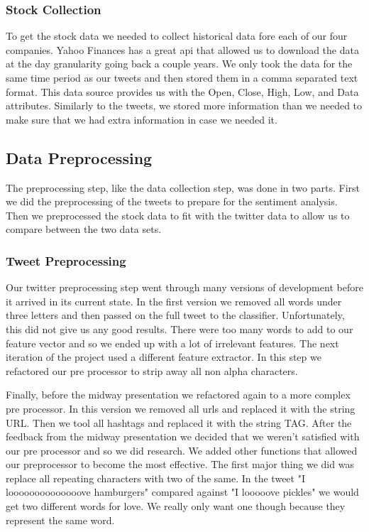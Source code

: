 \documentclass{acm_proc_article-sp}
\begin{document}
\inputminted{python}{examples/streaming.py}

\subsubsection{Stock Collection} 

To get the stock data we needed to collect historical data fore each of our
four companies. Yahoo Finances has a great api that allowed us to download the
data at the day granularity going back a couple years. We only took the data
for the same time period as our tweets and then stored them in a comma
separated text format.  This data source provides us with the Open, Close,
High, Low, and Data attributes. Similarly to the tweets, we stored more
information than we needed to make sure that we had extra information in case
we needed it. 

\subsection{Data Preprocessing}

The preprocessing step, like the data collection step, was done in two parts.
First we did the preprocessing of the tweets to prepare for the sentiment analysis.
Then we preprocessed the stock data to fit with the twitter data to allow us to 
compare between the two data sets.

\subsubsection{Tweet Preprocessing}

Our twitter preprocessing step went through many versions of development before
it arrived in its current state. In the first version we removed all words
under three letters and then passed on the full tweet to the classifier.
Unfortunately, this did not give us any good results. There were too many words
to add to our feature vector and so we ended up with a lot of irrelevant
features. The next iteration of the project used a different feature extractor.
In this step we refactored our pre processor to strip away all non alpha
characters. 

Finally, before the midway presentation we refactored again to a
more complex pre processor. In this version we removed all urls and replaced it
with the string URL. Then we tool all hashtags and replaced it with the string
TAG. After the feedback from the midway presentation we decided that we weren't
satisfied with our pre processor and so we did research. We added other
functions that allowed our preprocessor to become the most effective. The first
major thing we did was replace all repeating characters with two of the same.
In the tweet "I loooooooooooooove hamburgers" compared against "I looooove
pickles" we would get two different words for love. We really only want one
though because they represent the same word. 
\end{document}
